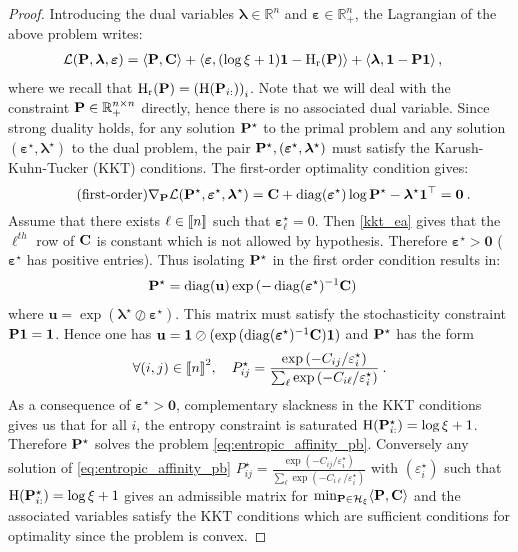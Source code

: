 \begin{proof}
Introducing the dual variables $\bm{\lambda} \in \mathbb{R}^n$ and $\bm{\varepsilon} \in \mathbb{R}_+^n$, the Lagrangian of the above problem writes:
\begin{align}
    \mathcal{L}(\mathbf{P}, \bm{\lambda}, \bm{\varepsilon}) &= \langle \mathbf{P}, \mathbf{C} \rangle + \langle \bm{\varepsilon}, (\log{\xi}+1) \bm{1} - \operatorname{H}_{\mathrm{r}}(\mathbf{P}) \rangle + \langle \bm{\lambda}, \bm{1} - \mathbf{P} \bm{1} \rangle\,,
\end{align}
where we recall that $\operatorname{H}_{\mathrm{r}}(\mathbf{P}) = \left( \operatorname{H}(\mathbf{P}_{i:}) \right)_{i}$. Note that we will deal with the constraint $\mathbf{P} \in \mathbb{R}_+^{n \times n}$ directly, hence there is no associated dual variable. Since strong duality holds, for any solution $\mathbf{P}^\star$ to the primal problem and any solution $(\bm{\varepsilon}^\star, \bm{\lambda}^\star)$ to the dual problem, the pair $\mathbf{P}^\star, (\bm{\varepsilon}^\star, \bm{\lambda}^\star)$ must satisfy the Karush-Kuhn-Tucker (KKT) conditions. The first-order optimality condition gives:
\begin{equation}
\label{kkt_ea}
\tag{first-order}
    \nabla_{\mathbf{P}} \mathcal{L}(\mathbf{P}^\star, \bm{\varepsilon}^\star, \bm{\lambda}^\star) = \mathbf{C} + \operatorname{diag}(\bm{\varepsilon}^\star)\log{\mathbf{P}^\star} - \bm{\lambda}^\star \bm{1}^\top = \bm{0} \:.
\end{equation}
Assume that there exists $\ell \in {[\![n]\!]}$ such that $\bm{\varepsilon}_\ell^\star = 0$. Then \eqref{kkt_ea} gives that the $\ell^{th}$ row of $\mathbf{C}$ is constant which is not allowed by hypothesis. Therefore $\bm{\varepsilon}^\star>\bm{0}$ (\ie $\bm{\varepsilon}^\star$ has positive entries). 
Thus isolating $\mathbf{P}^\star$ in the first order condition results in:
\begin{align}
    \mathbf{P}^\star &= \operatorname{diag}(\mathbf{u}) \exp{(-\operatorname{diag}(\bm{\varepsilon}^\star)^{-1}\mathbf{C})}
\end{align}
where $\mathbf{u} = \exp{(\bm{\lambda}^\star \oslash \bm{\varepsilon}^\star)}$.
This matrix must satisfy the stochasticity constraint $\mathbf{P} \bm{1}=\bm{1}$. Hence one has $\mathbf{u} = \bm{1} \oslash (\exp{(\operatorname{diag}(\bm{\varepsilon}^\star)^{-1}\mathbf{C})} \bm{1})$ and $\mathbf{P}^\star$ has the form
\begin{align}
    \forall (i,j) \in {[\![n]\!]}^2, \quad P^{\star}_{ij} = \frac{\exp{(-C_{ij}/\varepsilon^\star_i)}}{\sum_\ell \exp{(-C_{i\ell}/\varepsilon^\star_i)}} \:.
\end{align}
As a consequence of $\bm{\varepsilon}^\star \bm{>} \bm{0}$, complementary slackness in the KKT conditions gives us that for all $i$, the entropy constraint is saturated \ie $\operatorname{H}(\mathbf{P}^\star_{i:}) = \log{\xi} + 1$. Therefore $\mathbf{P}^\star$ solves the problem \eqref{eq:entropic_affinity_pb}. Conversely any solution of \eqref{eq:entropic_affinity_pb} $P^{\star}_{ij} = \frac{\exp{(-C_{ij}/\varepsilon^\star_i)}}{\sum_\ell \exp{(-C_{i\ell}/\varepsilon^\star_i)}}$ with $(\varepsilon^\star_i)$ such that $\operatorname{H}(\mathbf{P}^\star_{i:}) = \log{\xi} + 1$  gives an admissible matrix for $\min_{\mathbf{P} \in \mathcal{H}_\xi} \langle \mathbf{P}, \mathbf{C} \rangle$ and the associated variables satisfy the KKT conditions which are sufficient conditions for optimality since the problem is convex.

\end{proof}
